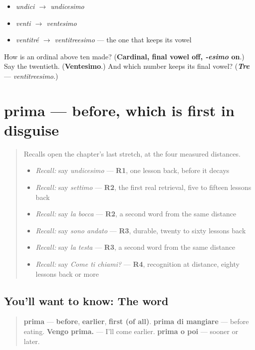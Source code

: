 \begin{itemize}
\raggedright
  \item \emph{undici $\to$ undicesimo}
  \item \emph{venti $\to$ ventesimo}
  \item \emph{ventitré $\to$ ventitreesimo} — the one that keeps its vowel
\end{itemize}

\begin{tcolorbox}[breakable,colback=teal!4,colframe=teal!35!black,title={Before you move on}]
How is an ordinal above ten made? (\textbf{Cardinal, final vowel off, \emph{-esimo} on}.) Say the twentieth. (\textbf{Ventesimo}.) And which number keeps its final vowel? (\emph{\textbf{Tre}} — \emph{ventitreesimo}.)
\end{tcolorbox}
\section[prima]{prima — before, which is first in disguise}

\label{lesson:IT-C28-prima}



\begin{quote}
Recalls open the chapter's last stretch, at the four measured distances.

\begin{itemize}
\raggedright
  \item \emph{Recall:} say \emph{undicesimo} — \textbf{R1}, one lesson back, before it decays
  \item \emph{Recall:} say \emph{settimo} — \textbf{R2}, the first real retrieval, five to fifteen lessons back
  \item \emph{Recall:} say \emph{la bocca} — \textbf{R2}, a second word from the same distance
  \item \emph{Recall:} say \emph{sono andato} — \textbf{R3}, durable, twenty to sixty lessons back
  \item \emph{Recall:} say \emph{la testa} — \textbf{R3}, a second word from the same distance
  \item \emph{Recall:} say \emph{Come ti chiami?} — \textbf{R4}, recognition at distance, eighty lessons back or more
\end{itemize}
\end{quote}

\subsection*{You'll want to know: The word}
\begin{quote}
\textbf{prima} — \textbf{before}, \textbf{earlier}, \textbf{first (of all)}. \textbf{prima di mangiare} — before eating. \textbf{Vengo prima.} — I'll come earlier. \textbf{prima o poi} — sooner or later.
\end{quote}

